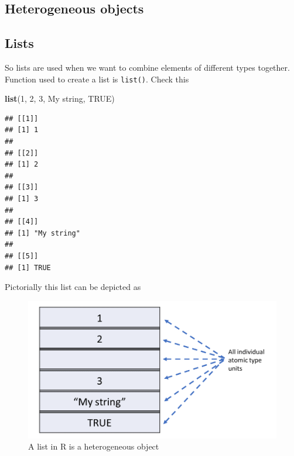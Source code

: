 \documentclass[
]{book}
\newenvironment{Shaded}{\begin{snugshade}}{\end{snugshade}}
\newcommand{\ConstantTok}[1]{\textcolor[rgb]{0.56,0.35,0.01}{#1}}
\newcommand{\DecValTok}[1]{\textcolor[rgb]{0.00,0.00,0.81}{#1}}
\newcommand{\FunctionTok}[1]{\textcolor[rgb]{0.13,0.29,0.53}{\textbf{#1}}}
\newcommand{\NormalTok}[1]{#1}
\newcommand{\StringTok}[1]{\textcolor[rgb]{0.31,0.60,0.02}{#1}}
\begin{document}
\hypertarget{heterogeneous-objects}{%
\subsection*{Heterogeneous objects}\label{heterogeneous-objects}}

\hypertarget{lists}{%
\subsection{Lists}\label{lists}}

So lists are used when we want to combine elements of different types together. Function used to create a list is \texttt{list()}. Check this

\begin{Shaded}
\begin{Highlighting}[]
\FunctionTok{list}\NormalTok{(}\DecValTok{1}\NormalTok{, }\DecValTok{2}\NormalTok{, }\DecValTok{3}\NormalTok{, }\StringTok{\textquotesingle{}My string\textquotesingle{}}\NormalTok{, }\ConstantTok{TRUE}\NormalTok{)}
\end{Highlighting}
\end{Shaded}

\begin{verbatim}
## [[1]]
## [1] 1
## 
## [[2]]
## [1] 2
## 
## [[3]]
## [1] 3
## 
## [[4]]
## [1] "My string"
## 
## [[5]]
## [1] TRUE
\end{verbatim}

Pictorially this list can be depicted as

\begin{figure}

{\centering \includegraphics[width=0.99\linewidth]{images/list_ex} 

}

\caption{A list in R is a heterogeneous object}\label{fig:exlist}
\end{figure}
\end{document}
